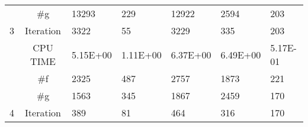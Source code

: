 \documentclass{article}
\begin{document}
\begin{table}[H]
\begin{tabular}{|c|c|l|l|l|l|l|}
		& \#g       & {\color[HTML]{000000} 13293}    & {\color[HTML]{000000} 229}      & {\color[HTML]{000000} 12922}    & {\color[HTML]{000000} 2594}     & {\color[HTML]{000000} 203}      \\ \cline{2-7} 
		\multirow{-4}{*}{3} & Iteration & {\color[HTML]{000000} 3322}     & {\color[HTML]{000000} 55}       & {\color[HTML]{000000} 3229}     & {\color[HTML]{000000} 335}      & {\color[HTML]{000000} 203}      \\ \hline
		& CPU TIME  & {\color[HTML]{000000} 5.15E+00} & {\color[HTML]{000000} 1.11E+00} & {\color[HTML]{000000} 6.37E+00} & {\color[HTML]{000000} 6.49E+00} & {\color[HTML]{000000} 5.17E-01} \\ \cline{2-7} 
		& \#f       & {\color[HTML]{000000} 2325}     & {\color[HTML]{000000} 487}      & {\color[HTML]{000000} 2757}     & {\color[HTML]{000000} 1873}     & {\color[HTML]{000000} 221}      \\ \cline{2-7} 
		& \#g       & {\color[HTML]{000000} 1563}     & {\color[HTML]{000000} 345}      & {\color[HTML]{000000} 1867}     & {\color[HTML]{000000} 2459}     & {\color[HTML]{000000} 170}      \\ \cline{2-7} 
		\multirow{-4}{*}{4} & Iteration & {\color[HTML]{000000} 389}      & {\color[HTML]{000000} 81}       & {\color[HTML]{000000} 464}      & {\color[HTML]{000000} 316}      & {\color[HTML]{000000} 170}      \\ \hline
	\end{tabular}
\end{table}
\end{document}

